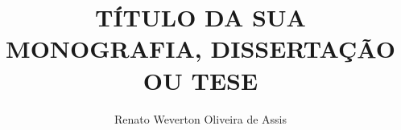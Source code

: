 \newcommand{\monog}{%
\uppercase{TÍTULO DA SUA MONOGRAFIA, DISSERTAÇÃO OU TESE}
}
\title{\monog}
\newcommand{\por}{%
Renato Weverton Oliveira de Assis
}
\author{\por}

\newcommand{\subtitulo}{subtítulo deve começar em letra minúscula}

\newcommand{\univ}{\hspace{0.1cm}Pontifícia \hspace{0.1cm}Universidade\hspace{0.1cm} Católica \hspace{0.1cm}de\hspace{0.2cm} Minas\hspace{0.2cm} Gerais}

\newcommand{\curso}{\hspace{0.1cm} Programa \hspace{0.1cm} de \hspace{0.1cm} Pós-graduação\hspace{0.1cm} em \hspace{0.1cm} Engenharia Elétrica}

\newcommand{\grau}{Mestre em  Engenharia Elétrica }
\newcommand{\tipo}{Dissertação}

\newcommand{\profOrientador}{Prof. Nome do Professor}
\newcommand{\profA}{Prof. Nome do Avaliador}
\newcommand{\profB}{Prof. Nome do Avaliador}

\newcommand{\areaConcentracao}{Inteligência Computacional e Sistemas Distribuídos}

\newcommand{\cidade}{Belo Horizonte}

\newcommand{\ano}{2016}

\newcommand{\dataCompleta}{31 de Janeiro de 2016}
